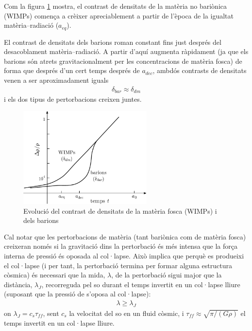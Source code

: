 Com la figura \ref{fig:contrast-densitats-wimp} mostra, el contrast de densitats de la matèria no bariònica (WIMPs) comença a crèixer apreciablement a partir de l'època de la igualtat matèria--radiació ($a_{eq}$).

El contrast de densitats dels barions roman constant fins just després del desacoblament matèria--radiació. A partir d'aquí augmenta ràpidament (ja que els barions són atrets gravitacionalment per les concentracions de matèria fosca) de forma que després d'un cert temps després de $a_{dec}$, ambdós contrasts de densitats venen a ser aproximadament iguals
\begin{align*}
	\delta_{bar} \approx \delta_{dm}
\end{align*}
i els dos tipus de pertorbacions creixen juntes.
\begin{figure}[h]
	\centering
	\includegraphics[width=0.6\textwidth]{./images/9-contrast-densitats-wimp}
	\caption{Evolució del contrast de densitats de la matèria fosca (WIMPs) i dels barions}
	\label{fig:contrast-densitats-wimp}
\end{figure}

Cal notar que les pertorbacions de matèria (tant bariònica com de matèria fosca) creixeran només si la gravitació dins la pertorbació és més intensa que la força interna de pressió és oposada al col·lapse. Això implica que perquè es produeixi el col·lapse (i per tant, la pertorbació termina per formar alguna estructura còsmica) és necessari que la mida, $\lambda$, de la pertorbació sigui major que la distància, $\lambda_{J}$, recorreguda pel so durant el temps invertit en un col·lapse lliure (suposant que la pressió de s'oposa al col·lapse):
\begin{align*}
	\lambda \geq \lambda_{J}
\end{align*}
on $\lambda_{J} = c_{s} \tau_{ff}$, sent $c_{s}$ la velocitat del so en un fluid còsmic, i $\tau_{ff} \approx \sqrt{\pi / (G \rho)}$ el temps invertit en un col·lapse lliure.

